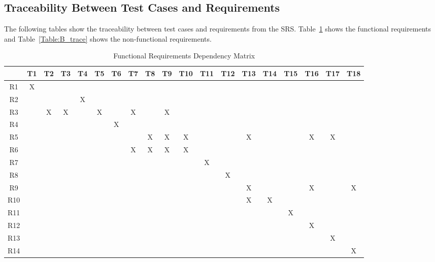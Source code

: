 \documentclass[12pt, titlepage]{article}
\begin{document}
\subsection{Traceability Between Test Cases and Requirements}

The following tables show the traceability between test cases and requirements from the SRS. Table~\ref{Table:A_trace} shows the functional requirements and Table~\ref{Table:B_trace} shows the non-functional requirements.

\begin{table}[H]
  \centering
  \caption{Functional Requirements Dependency Matrix}
  \begin{tabular}{|c|c|c|c|c|c|c|c|c|c|c|c|c|c|c|c|c|c|c|}
  \hline
  & T1 & T2 & T3 & T4 & T5 & T6 & T7 & T8 & T9 & T10 & T11 & T12 & T13 & T14 & T15 & T16 & T17 & T18\\
  \hline
  R1      &X & & & & & & & & & & & & & & & & &  \\ 
  \hline
  R2      & & & &X & & & & & & & & & & & & & &   \\ 
  \hline
  R3      & &X &X & &X & &X & &X & & & & & & & & &  \\ 
  \hline
  R4      & & & & & &X & & & & & & & &  & & & &  \\ 
  \hline
  R5      & & & & & & & &X &X &X & & &X &  & &X &X &  \\ 
  \hline
  R6      & & & & & & &X &X &X &X & & & & & & & &   \\ 
  \hline
  R7      & & & & & & & & & & &X & & &  & & & &  \\ 
  \hline
  R8      & & & & & & & & & & & &X & & & & & &   \\ 
  \hline
  R9      & & & & & & & & & & & & &X & & &X & &X  \\ 
  \hline
  R10      & & & & & & & & & & & & &X &X & & & &  \\ 
  \hline
  R11      & & & & & & & & & & & & & & &X & & &   \\ 
  \hline
  R12      & & & & & & & & & & & & & & & &X & &   \\ 
  \hline
  R13      & & & & & & & & & & & & & & & & &X &   \\ 
  \hline
  R14      & & & & & & & & & & & & & & & & & &X  \\ 
  \hline
  
  \end{tabular}
  
  \label{Table:A_trace}
  \end{table}
  
\end{document}
